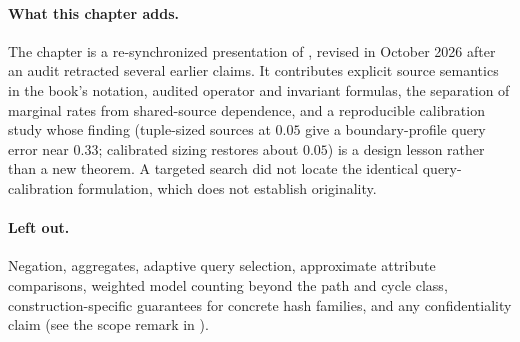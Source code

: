 \paragraph{What this chapter adds.}
The chapter is a re-synchronized presentation of \textcite{towell-bernoulli-relations},
revised in October 2026 after an audit retracted several earlier claims. It contributes
explicit source semantics in the book's notation, audited operator and invariant
formulas, the separation of marginal rates from shared-source dependence, and a
reproducible calibration study whose finding (tuple-sized sources at $0.05$ give a
boundary-profile query error near $0.33$; calibrated sizing restores about $0.05$)
is a design lesson rather than a new theorem. A targeted search did not locate the
identical query-calibration formulation, which does not establish originality.

\paragraph{Left out.}
Negation, aggregates, adaptive query selection, approximate attribute comparisons,
weighted model counting beyond the path and cycle class, construction-specific
guarantees for concrete hash families, and any confidentiality claim (see the scope remark in ).
